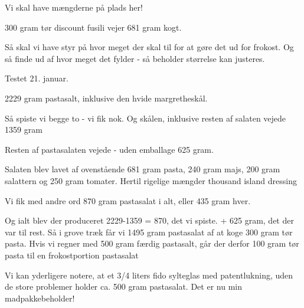 \documentclass[
]{book}
\begin{document}
Vi skal have mængderne på plads her!

300 gram tør discount fusili vejer
681 gram kogt.

Så skal vi have styr på hvor meget der skal til for at gøre det ud for frokost. Og så
finde ud af hvor meget det fylder - så beholder størrelse kan justeres.

Testet 21. januar.

2229 gram pastasalt, inklusive den hvide margretheskål.

Så spiste vi begge to - vi fik nok. Og skålen, inklusive
resten af salaten vejede 1359 gram

Resten af pastasalaten vejede - uden emballage 625 gram.

Salaten blev lavet af ovenstående 681 gram pasta, 240 gram
majs, 200 gram salattern og 250 gram tomater. Hertil rigelige
mængder thousand island dressing

Vi fik med andre ord 870 gram pastasalat i alt, eller 435 gram hver.

Og ialt blev der produceret
2229-1359 = 870, det vi spiste.
+ 625 gram, det der var til rest.
Så i grove træk får vi 1495 gram pastasalat af at koge 300 gram
tør pasta. Hvis vi regner med 500 gram færdig pastasalt,
går der derfor 100 gram tør pasta til en frokostportion pastasalat

Vi kan yderligere notere, at et 3/4 liters fido sylteglas med
patentlukning, uden de store problemer holder ca. 500 gram
pastasalat. Det er nu min madpakkebeholder!
\end{document}
